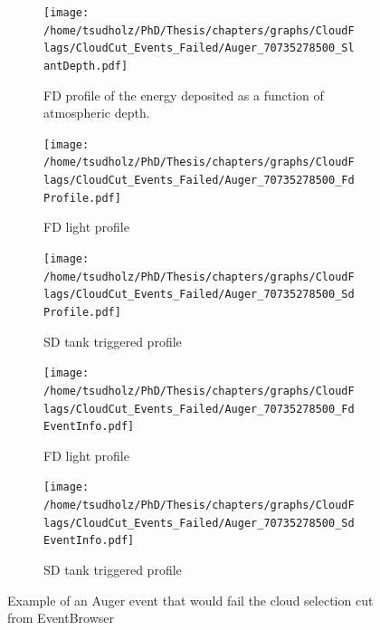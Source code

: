 \begin{figure}[!p]
\centering
 \vspace{2cm}
  \begin{subfigure}[b]{\textwidth}
  \centering
  \texttt{[image: /home/tsudholz/PhD/Thesis/chapters/graphs/CloudFlags/CloudCut\_Events\_Failed/Auger\_70735278500\_SlantDepth.pdf]}
  \caption{FD profile of the energy deposited as a function of atmospheric depth.}
  \end{subfigure}
 \vspace{0.5cm}
  \begin{subfigure}[b]{0.45\textwidth}
  	\centering
  	\texttt{[image: /home/tsudholz/PhD/Thesis/chapters/graphs/CloudFlags/CloudCut\_Events\_Failed/Auger\_70735278500\_FdProfile.pdf]}
  	\caption{FD light profile}
  \end{subfigure}
  \begin{subfigure}[b]{0.45\textwidth}
  	\centering
  	\texttt{[image: /home/tsudholz/PhD/Thesis/chapters/graphs/CloudFlags/CloudCut\_Events\_Failed/Auger\_70735278500\_SdProfile.pdf]}
  	\caption{SD tank triggered profile}
  \end{subfigure}

  \begin{subfigure}[b]{0.45\textwidth}
  	\centering
	\texttt{[image: /home/tsudholz/PhD/Thesis/chapters/graphs/CloudFlags/CloudCut\_Events\_Failed/Auger\_70735278500\_FdEventInfo.pdf]}
  	\caption{FD light profile}
  \end{subfigure}
  \begin{subfigure}[b]{0.45\textwidth}
  	\centering
	\texttt{[image: /home/tsudholz/PhD/Thesis/chapters/graphs/CloudFlags/CloudCut\_Events\_Failed/Auger\_70735278500\_SdEventInfo.pdf]}
  	\caption{SD tank triggered profile}
  \end{subfigure}
  \caption{Example of an Auger event that would fail the cloud selection cut from EventBrowser}
\end{figure}

